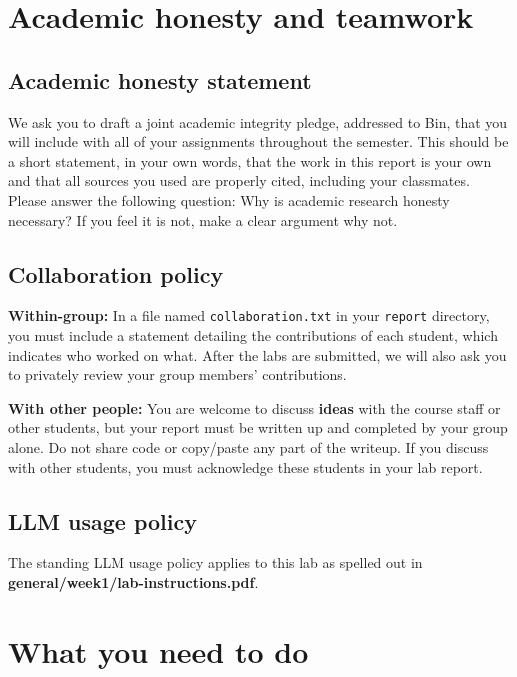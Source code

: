 \documentclass[letterpaper,12pt]{article}
\begin{document}
\section{Academic honesty and teamwork}

\subsection{Academic honesty statement}

We ask you to draft a joint academic integrity pledge, addressed to Bin, that you will include with all of your assignments throughout the semester. This should be a short statement, in your own words, that the work in this report is your own and that all sources you used are properly cited, including your classmates. Please answer the following question: Why is academic research honesty necessary? If you feel it is not, make a clear argument why not.

\subsection{Collaboration policy}

\textbf{Within-group:} In a file named \texttt{collaboration.txt} in your \texttt{report} directory, you must include a statement detailing the contributions of each student, which indicates who worked on what. After the labs are submitted, we will also ask you to privately review your group members' contributions.

\textbf{With other people:} 
You are welcome to discuss \textbf{ideas} with the course staff or other students, but your report must be written up and completed by your group alone. Do not share code or copy/paste any part of the writeup. If you discuss with other students, you must acknowledge these students in your lab report.

\subsection{LLM usage policy}

The standing LLM usage policy applies to this lab as spelled out in  \textbf{general/week1/lab-instructions.pdf}.

\section{What you need to do}
\end{document}
